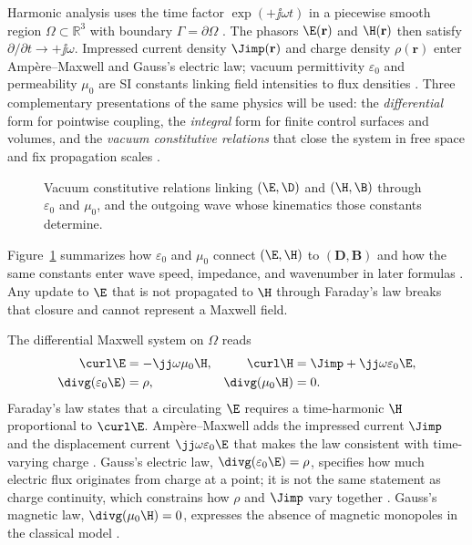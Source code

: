 Harmonic analysis uses the time factor $\exp(+\jj\omega t)$ in a piecewise smooth region $\Omega\subset\mathbb{R}^{3}$ with boundary $\Gamma=\partial\Omega$ \cite{stratton1941}. The phasors $\E(\mathbf{r})$ and $\H(\mathbf{r})$ then satisfy $\partial/\partial t\to +\jj\omega$. Impressed current density $\Jimp(\mathbf{r})$ and charge density $\rho(\mathbf{r})$ enter Amp\`ere--Maxwell and Gauss's electric law; vacuum permittivity $\varepsilon_0$ and permeability $\mu_0$ are SI constants linking field intensities to flux densities \cite{stratton1941,harrington2001}. Three complementary presentations of the same physics will be used: the \emph{differential} form for pointwise coupling, the \emph{integral} form for finite control surfaces and volumes, and the \emph{vacuum constitutive relations} that close the system in free space and fix propagation scales \cite{stratton1941}.

\begin{figure}[t]
\centering
\VolIPhysFig{\VolIPhysVacuumClosureMap}
\caption{Vacuum constitutive relations linking $(\E,\D)$ and $(\H,\B)$ through $\varepsilon_0$ and $\mu_0$, and the outgoing wave whose kinematics those constants determine.}
\label{fig:ch1.vacuum-closure-map}
\end{figure}
Figure~\ref{fig:ch1.vacuum-closure-map} summarizes how $\varepsilon_0$ and $\mu_0$ connect $(\E,\H)$ to $(\mathbf{D},\mathbf{B})$ and how the same constants enter wave speed, impedance, and wavenumber in later formulas \cite{maxwell1873,stratton1941}. Any update to $\E$ that is not propagated to $\H$ through Faraday's law breaks that closure and cannot represent a Maxwell field.

The differential Maxwell system on $\Omega$ reads
\begin{equation}
\label{eq:ch1.maxwell-local}
\begin{aligned}
\curl \E&=-\jj\omega\mu_0\H, &
\curl \H&=\Jimp+\jj\omega\varepsilon_0\E,\\
\divg\!\left(\varepsilon_0\E\right)&=\rho, &
\divg\!\left(\mu_0\H\right)&=0.
\end{aligned}
\end{equation}
Faraday's law states that a circulating $\E$ requires a time-harmonic $\H$ proportional to $\curl\E$. Amp\`ere--Maxwell adds the impressed current $\Jimp$ and the displacement current $\jj\omega\varepsilon_0\E$ that makes the law consistent with time-varying charge \cite{maxwell1873}. Gauss's electric law, $\divg(\varepsilon_0\E)=\rho$, specifies how much electric flux originates from charge at a point; it is not the same statement as charge continuity, which constrains how $\rho$ and $\Jimp$ vary together \cite{stratton1941}. Gauss's magnetic law, $\divg(\mu_0\H)=0$, expresses the absence of magnetic monopoles in the classical model \cite{maxwell1873}.

